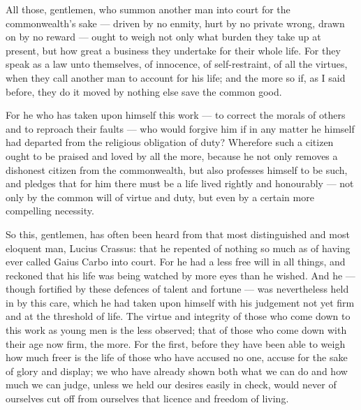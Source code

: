 %

 All those, gentlemen, who summon another man into court for the commonwealth's sake --- driven by no enmity, hurt by no private wrong, drawn on by no reward --- ought to weigh not only what burden they take up at present, but how great a business they undertake for their whole life. For they speak as a law unto themselves, of innocence, of self-restraint, of all the virtues, when they call another man to account for his life; and the more so if, as I said before, they do it moved by nothing else save the common good.

 For he who has taken upon himself this work --- to correct the morals of others and to reproach their faults --- who would forgive him if in any matter he himself had departed from the religious obligation of duty? Wherefore such a citizen ought to be praised and loved by all the more, because he not only removes a dishonest citizen from the commonwealth, but also professes himself to be such, and pledges that for him there must be a life lived rightly and honourably --- not only by the common will of virtue and duty, but even by a certain more compelling necessity.

 So this, gentlemen, has often been heard from that most distinguished and most eloquent man, Lucius Crassus: that he repented of nothing so much as of having ever called Gaius Carbo into court. For he had a less free will in all things, and reckoned that his life was being watched by more eyes than he wished. And he --- though fortified by these defences of talent and fortune --- was nevertheless held in by this care, which he had taken upon himself with his judgement not yet firm and at the threshold of life. The virtue and integrity of those who come down to this work as young men is the less observed; that of those who come down with their age now firm, the more. For the first, before they have been able to weigh how much freer is the life of those who have accused no one, accuse for the sake of glory and display; we who have already shown both what we can do and how much we can judge, unless we held our desires easily in check, would never of ourselves cut off from ourselves that licence and freedom of living.

